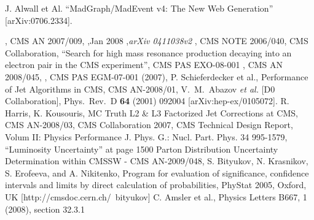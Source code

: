 \documentclass{cmspaper}
\begin{document}
\begin{linenumbers}
\begin{thebibliography}{}
  
  J. Alwall et Al.
  ``MadGraph/MadEvent v4: The New Web Generation''
  [arXiv:0706.2334].
  
  
, CMS AN 2007/009,
,Jan 2008 ,{\em arXiv 0411038v2}
, CMS NOTE 2006/040,
 {CMS Collaboration, ``Search for high mass resonance production decaying into an electron pair in the CMS experiment''}, CMS PAS EXO-08-001
, CMS AN 2008/045,
, CMS PAS EGM-07-001 (2007),
 {P. Schieferdecker et al., Performance of Jet Algorithms in CMS}, CMS AN-2008/01,
  V.~M.~Abazov {\it et al.}  [D0 Collaboration], 	 
  Phys.\ Rev.\  D {\bf 64} (2001) 092004 	 
  [arXiv:hep-ex/0105072]. 	 
 {R. Harris, K. Kousouris, MC Truth L2 \& L3 Factorized Jet Corrections at CMS}, CMS AN-2008/03,
 {CMS Collaboration 2007, CMS Technical Design Report, Volum II: Physics Performance} 
J. Phys. G.: Nucl. Part. Phys. 34 995-1579, ``Luminosity Uncertainty'' at page 1500
 {Parton Distribution Uncertainty Determination within CMSSW - CMS AN-2009/048}, %
 S. Bityukov, N. Krasnikov, S. Erofeeva, and A. Nikitenko, Program for evaluation of significance,
  confidence intervals and limits by direct calculation of probabilities, PhyStat 2005, Oxford, UK 
  [http://cmsdoc.cern.ch/~bityukov]
  C. Amsler et al., Physics Letters B667, 1 (2008), section 32.3.1
  
\end{thebibliography}

\end{linenumbers}
\end{document}
